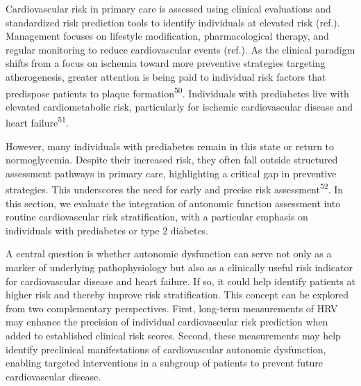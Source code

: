 \documentclass[
  a4paper,
  headsepline=true,
  open=any]{scrbook}
\begin{document}
Cardiovascular risk in primary care is assessed using clinical
evaluations and standardized risk prediction tools to identify
individuals at elevated risk (ref.). Management focuses on lifestyle
modification, pharmacological therapy, and regular monitoring to reduce
cardiovascular events (ref.). As the clinical paradigm shifts from a
focus on ischemia toward more preventive strategies targeting
atherogenesis, greater attention is being paid to individual risk
factors that predispose patients to plaque
formation\textsuperscript{50}. Individuals with prediabetes live with
elevated cardiometabolic risk, particularly for ischemic cardiovascular
disease and heart failure\textsuperscript{51}.

However, many individuals with prediabetes remain in this state or
return to normoglycemia. Despite their increased risk, they often fall
outside structured assessment pathways in primary care, highlighting a
critical gap in preventive strategies. This underscores the need for
early and precise risk assessment\textsuperscript{52}. In this section,
we evaluate the integration of autonomic function assessment into
routine cardiovascular risk stratification, with a particular emphasis
on individuals with prediabetes or type 2 diabetes.

A central question is whether autonomic dysfunction can serve not only
as a marker of underlying pathophysiology but also as a clinically
useful risk indicator for cardiovascular disease and heart failure. If
so, it could help identify patients at higher risk and thereby improve
risk stratification. This concept can be explored from two complementary
perspectives. First, long-term measurements of HRV may enhance the
precision of individual cardiovascular risk prediction when added to
established clinical risk scores. Second, these measurements may help
identify preclinical manifestations of cardiovascular autonomic
dysfunction, enabling targeted interventions in a subgroup of patients
to prevent future cardiovascular disease.
\end{document}
